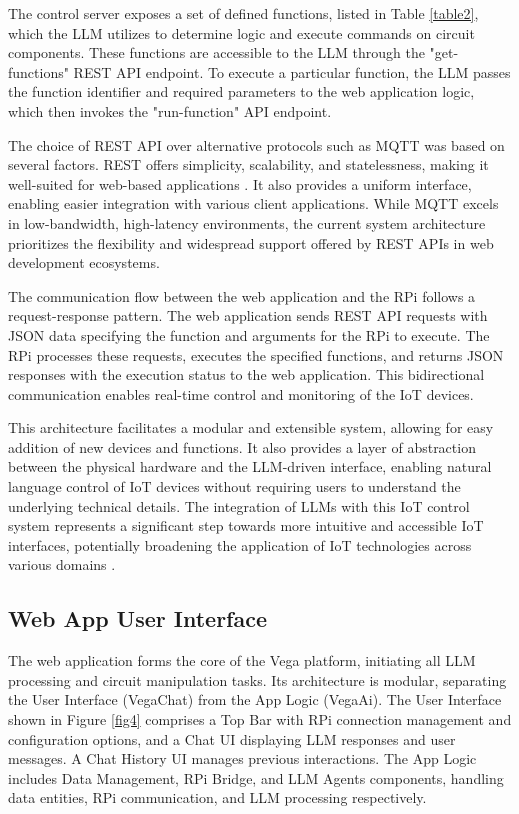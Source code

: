 \documentclass[lettersize,journal]{IEEEtran}
\begin{document}
The control server exposes a set of defined functions, listed in Table \ref{table2}, which the LLM utilizes to determine logic and execute commands on circuit components. These functions are accessible to the LLM through the "get-functions" REST API endpoint. To execute a particular function, the LLM passes the function identifier and required parameters to the web application logic, which then invokes the "run-function" API endpoint. 

The choice of REST API over alternative protocols such as MQTT was based on several factors. REST offers simplicity, scalability, and statelessness, making it well-suited for web-based applications \cite{s21206904}. It also provides a uniform interface, enabling easier integration with various client applications. While MQTT excels in low-bandwidth, high-latency environments, the current system architecture prioritizes the flexibility and widespread support offered by REST APIs in web development ecosystems.

The communication flow between the web application and the RPi follows a request-response pattern. The web application sends REST API requests with JSON data specifying the function and arguments for the RPi to execute. The RPi processes these requests, executes the specified functions, and returns JSON responses with the execution status to the web application. This bidirectional communication enables real-time control and monitoring of the IoT devices.

This architecture facilitates a modular and extensible system, allowing for easy addition of new devices and functions. It also provides a layer of abstraction between the physical hardware and the LLM-driven interface, enabling natural language control of IoT devices without requiring users to understand the underlying technical details. The integration of LLMs with this IoT control system represents a significant step towards more intuitive and accessible IoT interfaces, potentially broadening the application of IoT technologies across various domains \cite{taylor2010software}.

\subsection{Web App User Interface}

The web application forms the core of the Vega platform, initiating all LLM processing and circuit manipulation tasks. Its architecture is modular, separating the User Interface (VegaChat) from the App Logic (VegaAi). The User Interface shown in Figure \ref{fig4} comprises a Top Bar with RPi connection management and configuration options, and a Chat UI displaying LLM responses and user messages. A Chat History UI manages previous interactions. The App Logic includes Data Management, RPi Bridge, and LLM Agents components, handling data entities, RPi communication, and LLM processing respectively.
\end{document}
